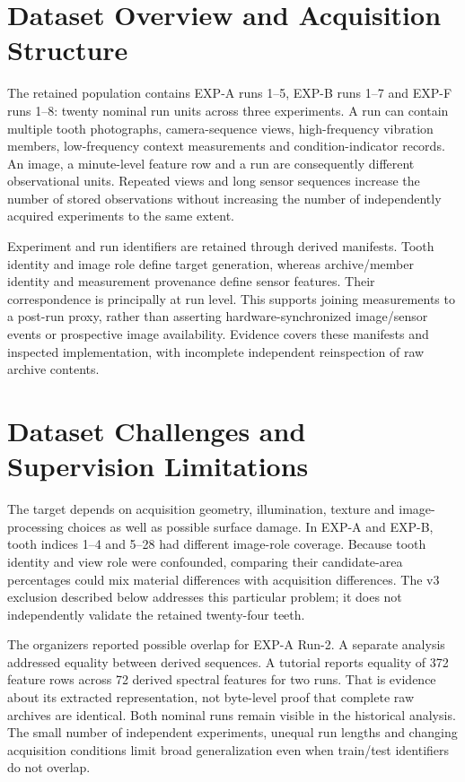 \section{Dataset Overview and Acquisition Structure}
The retained population contains EXP-A runs 1--5, EXP-B runs 1--7 and EXP-F runs 1--8: twenty nominal run units across three experiments. A run can contain multiple tooth photographs, camera-sequence views, high-frequency vibration members, low-frequency context measurements and condition-indicator records. An image, a minute-level feature row and a run are consequently different observational units. Repeated views and long sensor sequences increase the number of stored observations without increasing the number of independently acquired experiments to the same extent.

Experiment and run identifiers are retained through derived manifests. Tooth identity and image role define target generation, whereas archive/member identity and measurement provenance define sensor features. Their correspondence is principally at run level. This supports joining measurements to a post-run proxy, rather than asserting hardware-synchronized image/sensor events or prospective image availability. Evidence covers these manifests and inspected implementation, with incomplete independent reinspection of raw archive contents.

\section{Dataset Challenges and Supervision Limitations}
The target depends on acquisition geometry, illumination, texture and image-processing choices as well as possible surface damage. In EXP-A and EXP-B, tooth indices 1--4 and 5--28 had different image-role coverage. Because tooth identity and view role were confounded, comparing their candidate-area percentages could mix material differences with acquisition differences. The v3 exclusion described below addresses this particular problem; it does not independently validate the retained twenty-four teeth.

The organizers reported possible overlap for EXP-A Run-2. A separate analysis addressed equality between derived sequences. A tutorial reports equality of 372 feature rows across 72 derived spectral features for two runs. That is evidence about its extracted representation, not byte-level proof that complete raw archives are identical. Both nominal runs remain visible in the historical analysis. The small number of independent experiments, unequal run lengths and changing acquisition conditions limit broad generalization even when train/test identifiers do not overlap.


